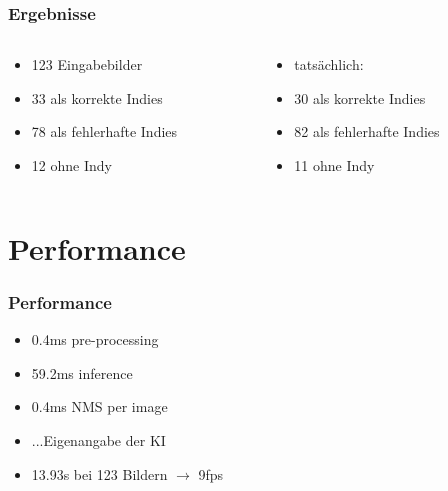 \documentclass[ignorenonframetext,naustrian,12pt,t]{beamer}
\begin{document}
\begin{frame}
	\frametitle{Ergebnisse}
		\centering
	\begin{columns}
     \begin{column}{0.5\textwidth}
		\begin{itemize}[label={\color{myTitleColour}\textbullet}]
		\item 123 Eingabebilder
		\item 33 als korrekte Indies 
		\item 78 als fehlerhafte Indies 
		\item 12 ohne Indy
		\end{itemize}
     \end{column}
     \begin{column}{0.49\textwidth}
		\begin{itemize}[label={\color{myTitleColour}\textbullet}]
		\item tatsächlich:
		\item 30 als korrekte Indies 
		\item 82 als fehlerhafte Indies 
		\item 11 ohne Indy
		\end{itemize}

      \end{column}
	\end{columns}
\end{frame}

\section{Performance}
\begin{frame}
	\frametitle{Performance}
		\begin{itemize}[label={\color{myTitleColour}\textbullet}]
		\item 0.4ms pre-processing
		\item 59.2ms inference
		\item 0.4ms NMS per image
		\item ...Eigenangabe der KI
		\item 13.93s bei 123 Bildern $\rightarrow$ 9fps
		\end{itemize}
\end{frame}
\end{document}
